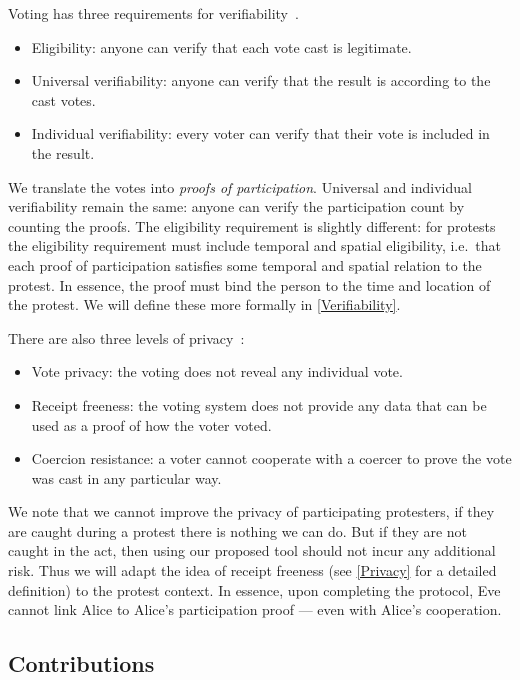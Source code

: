 Voting has three requirements for 
verifiability~\cite{VerifyingPrivacyPropertiesOfVotingProtocols}.
\begin{itemize}
  \item Eligibility: anyone can verify that each vote cast is legitimate.
  \item Universal verifiability: anyone can verify that the result is according 
    to the cast votes.
  \item Individual verifiability: every voter can verify that their vote is 
    included in the result.
\end{itemize}
We translate the votes into \emph{proofs of participation}.
Universal and individual verifiability remain the same: anyone can verify the 
participation count by counting the proofs.
The eligibility requirement is slightly different:
for protests the eligibility requirement must include temporal and spatial 
eligibility, i.e.\ that each proof of participation satisfies some temporal and 
spatial relation to the protest.
In essence, the proof must bind the person to the time and location of the 
protest.
We will define these more formally in \cref{Verifiability}.

There are also three levels of 
privacy~\cite{VerifyingPrivacyPropertiesOfVotingProtocols}:
\begin{itemize}
  \item\label{VotePrivacy} Vote privacy: the voting does not reveal any 
    individual vote.
  \item\label{ReceiptFreeness} Receipt freeness: the voting system does not 
    provide any data that can be used as a proof of how the voter voted.
  \item\label{CoercionResistance} Coercion resistance: a voter cannot cooperate 
    with a coercer to prove the vote was cast in any particular way.
\end{itemize}
We note that we cannot improve the privacy of participating protesters, if they 
are caught during a protest there is nothing we can do.
But if they are not caught in the act, then using our proposed tool should not 
incur any additional risk.
Thus we will adapt the idea of receipt freeness (see \cref{Privacy} for a 
detailed definition) to the protest context.
In essence, upon completing the protocol, Eve cannot link Alice to Alice's 
participation proof --- even with Alice's cooperation.

\subsection{Contributions}

